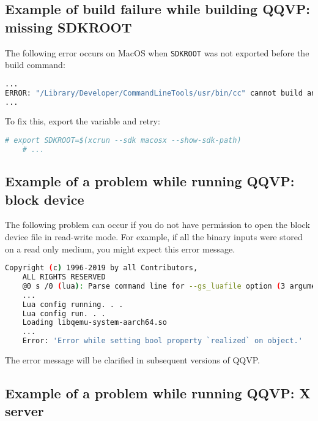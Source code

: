 \subsection{Example of build failure while building QQVP: missing SDKROOT}
\label{sec:missingSDKROOT}

The following error occurs on MacOS when {\small{\lstinline!SDKROOT!}} was not
exported before the build command:

\small
\begin{lstlisting}[language=bash]
    ...
ERROR: "/Library/Developer/CommandLineTools/usr/bin/cc" cannot build an executable (is your linker broken?)
...
\end{lstlisting}
\normalsize

To fix this, export the variable and retry:

\small
\begin{lstlisting}[language=bash]
    # export SDKROOT=$(xcrun --sdk macosx --show-sdk-path)
    # ...
\end{lstlisting}
\normalsize

\clearpage
\subsection{Example of a problem while running QQVP: block device}

The following problem can occur if you do not have permission to open the block device file in read-write mode. For example, if all the binary inputs were stored on a read only medium, you might expect this error message.

\small
\begin{lstlisting}[language=bash]
    Copyright (c) 1996-2019 by all Contributors,
    ALL RIGHTS RESERVED
    @0 s /0 (lua): Parse command line for --gs_luafile option (3 arguments)
    ...
    Lua config running. . .
    Lua config run. . .
    Loading libqemu-system-aarch64.so
    ...
    Error: 'Error while setting bool property `realized` on object.'
\end{lstlisting}
\normalsize

\note The error message will be clarified in subsequent versions of QQVP.

\subsection{Example of a problem while running QQVP: X server}
\label{sec:xServer}

